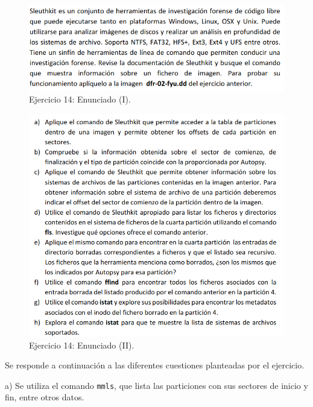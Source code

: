 \documentclass[11pt]{article}
\begin{document}
\begin{figure}[H]
    \caption{Ejercicio 14: Enunciado (I).}
  \centering
  \includegraphics[scale=0.7]{other/enunciado_p03_e14-1.png}
\end{figure}

\begin{figure}[H]
    \caption{Ejercicio 14: Enunciado (II).}
  \centering
  \includegraphics[scale=0.7]{other/enunciado_p03_e14-2.png}
\end{figure}

Se responde a continuación a las diferentes cuestiones planteadas por el ejercicio.

a) Se utiliza el comando \verb|mmls|, que lista las particiones con sus sectores de inicio y fin, entre otros datos.
\end{document}
